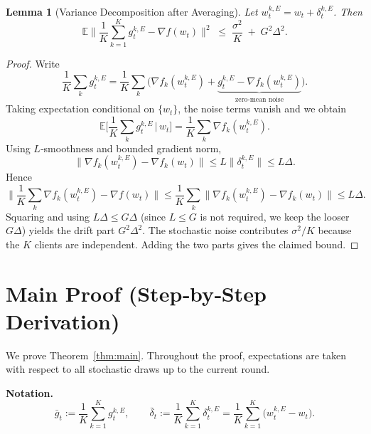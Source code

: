 \documentclass{article}
\newcommand{\E}{\mathbb{E}}
\newtheorem{lemma}{Lemma}
\begin{document}
\begin{lemma}[Variance Decomposition after Averaging]\label{lem:var-avg}
Let $w_{t}^{k,E}=w_t+\delta_{t}^{k,E}$. Then
\[
\E\!\Big\|\frac1K\sum_{k=1}^K g_{t}^{k,E}
- \nabla f(w_t)\Big\|^2
\;\le\;
\frac{\sigma^2}{K}
\;+\;
G^2\Delta^2 .
\]
\end{lemma}
\begin{proof}
Write
\[
\frac1K\sum_{k} g_{t}^{k,E}
= \frac1K\sum_{k}\Big(\nabla f_k(w_{t}^{k,E})
+ \underbrace{g_{t}^{k,E}-\nabla f_k(w_{t}^{k,E})}_{\text{zero‑mean noise}}\Big).
\]
Taking expectation conditional on $\{w_t\}$, the noise terms vanish and we obtain
\[
\E\!\Big[\frac1K\sum_{k} g_{t}^{k,E}\,\big|\,w_t\Big]
= \frac1K\sum_{k}\nabla f_k(w_{t}^{k,E}).
\]
Using $L$‑smoothness and bounded gradient norm,
\[
\big\|\nabla f_k(w_{t}^{k,E})-\nabla f_k(w_t)\big\|
\le L\|\delta_{t}^{k,E}\|\le L\Delta .
\]
Hence
\[
\Big\|\frac1K\sum_{k}\nabla f_k(w_{t}^{k,E})-\nabla f(w_t)\Big\|
\le \frac1K\sum_{k}\big\|\nabla f_k(w_{t}^{k,E})-\nabla f_k(w_t)\big\|
\le L\Delta .
\]
Squaring and using $L\Delta\le G\Delta$ (since $L\le G$ is not required, we keep the
looser $G\Delta$) yields the drift part $G^2\Delta^2$.
The stochastic noise contributes $\sigma^2/K$ because the $K$ clients are
independent. Adding the two parts gives the claimed bound.
\end{proof}

\section*{Main Proof (Step‑by‑Step Derivation)}
We prove Theorem~\ref{thm:main}. Throughout the proof, expectations are taken
with respect to all stochastic draws up to the current round.

\noindent\textbf{Notation.}
\[
\bar g_t:=\frac1K\sum_{k=1}^K g_{t}^{k,E},\qquad
\bar\delta_t:=\frac1K\sum_{k=1}^K \delta_{t}^{k,E}= \frac1K\sum_{k=1}^K\big(w_{t}^{k,E}-w_t\big).
\]
\end{document}
